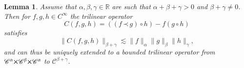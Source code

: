 \documentclass[a4paper,11pt]{article}
\newtheorem{lemma}{Lemma}
{\theorembodyfont{\rmfamily}\newtheorem{remark}{Remark}}
\newcommand{\CC}{\mathscr{C}}
\newcommand{\lpara}{\,\mathord{\prec}\,}
\newcommand{\reso}{\,\mathord{\circ}\,}
\begin{document}
\begin{lemma}
  \label{lemma:commutator}Assume that $\alpha, \beta, \gamma \in \mathbb{R}$
  are such that $\alpha + \beta + \gamma > 0$ and $\beta + \gamma \neq 0$.
  Then for $f, g, h \in C^{\infty}$ the trilinear operator
  \[ C (f, g, h) = ((f \lpara g) \reso h) - f (g \reso h) \]
  satisfies
  \begin{equation}
    \label{eq:commutator bound} \|C (f, g, h)\|_{\beta + \gamma} \lesssim
    \|f\|_{\alpha} \|g\|_{\beta} \|h\|_{\gamma},
  \end{equation}
  and can thus be uniquely extended to a bounded trilinear operator from
  $\CC^{\alpha} \hspace{-0.17em} \times \hspace{-0.17em} \CC^{\beta}
  \hspace{-0.17em} \times \hspace{-0.17em} \CC^{\alpha}$ to $\CC^{\beta +
  \gamma}$.
\end{lemma}
\end{document}
